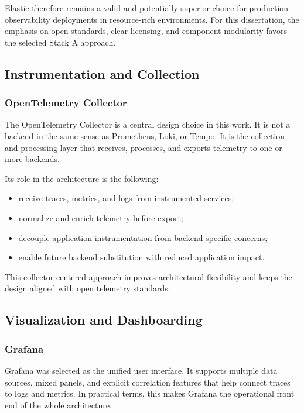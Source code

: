 Elastic therefore remains a valid and potentially superior choice for production observability deployments in resource-rich environments. For this dissertation, the emphasis on open standards, clear licensing, and component modularity favors the selected Stack A approach.

\subsection{Instrumentation and Collection}
\label{subsec:tracing_tools}

\subsubsection{OpenTelemetry Collector}
\label{subsubsec:opentelemetry}

The OpenTelemetry Collector is a central design choice in this work. It is not a backend in the same sense as Prometheus, Loki, or Tempo. It is the collection and processing layer that receives, processes, and exports telemetry to one or more backends.

Its role in the architecture is the following:
\begin{itemize}
    \item receive traces, metrics, and logs from instrumented services;
    \item normalize and enrich telemetry before export;
    \item decouple application instrumentation from backend specific concerns;
    \item enable future backend substitution with reduced application impact.
\end{itemize}

This collector centered approach improves architectural flexibility and keeps the design aligned with open telemetry standards.

\subsection{Visualization and Dashboarding}
\label{subsec:visualization_tools}

\subsubsection{Grafana}
\label{subsubsec:grafana}

Grafana was selected as the unified user interface. It supports multiple data sources, mixed panels, and explicit correlation features that help connect traces to logs and metrics. In practical terms, this makes Grafana the operational front end of the whole architecture.


